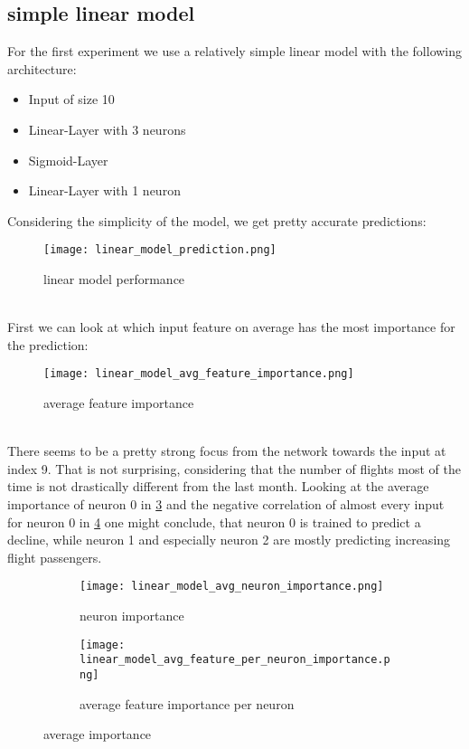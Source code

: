 \documentclass{article}
\begin{document}
\subsection{simple linear model}
For the first experiment we use a relatively simple linear model with the following architecture: 
\begin{itemize}
\item Input of size 10
\item Linear-Layer with 3 neurons
\item Sigmoid-Layer
\item Linear-Layer with 1 neuron
\end{itemize}
Considering the simplicity of the model, we get pretty accurate predictions:
\begin{figure}[h!]
\centering
\texttt{[image: linear\_model\_prediction.png]}
\caption{linear model performance}
\label{fig:lin_model_perf}
\end{figure} \\
First we can look at which input feature on average has the most importance for the prediction:
\begin{figure}[ht!]
\centering
\texttt{[image: linear\_model\_avg\_feature\_importance.png]}
\caption{average feature importance}
\label{fig:lin_model_afi}
\end{figure} \\

There seems to be a pretty strong focus from the network towards the input at index 9. That is not surprising, considering that the number of flights most of the time is not drastically different from the last month. Looking at the average importance of neuron 0 in \ref{fig:lin_model_ani} and the negative correlation of almost every input for neuron 0 in \ref{fig:lin_model_anfi} one might conclude, that neuron 0 is trained to predict a decline, while neuron 1 and especially neuron 2 are mostly predicting increasing flight passengers.

\begin{figure}[h!]
     \centering
     \begin{subfigure}[b]{0.2\textwidth}
         \centering
         \texttt{[image: linear\_model\_avg\_neuron\_importance.png]}
         \caption{neuron importance}
         \label{fig:lin_model_ani}
     \end{subfigure}
     \hspace*{\fill}
     \begin{subfigure}[b]{0.4\textwidth}
         \centering
         \texttt{[image: linear\_model\_avg\_feature\_per\_neuron\_importance.png]}
         \caption{average feature importance per neuron}
         \label{fig:lin_model_anfi}
     \end{subfigure}
     \hspace*{\fill}
        \caption{average importance}
        \label{fig:lin_model_a_f_i}
\end{figure}
\end{document}
